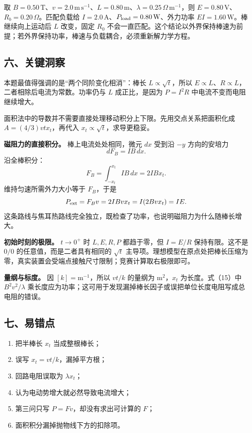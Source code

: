 \documentclass[12pt,a4paper,UTF8]{ctexart}
\newcommand{\tightlist}{\setlength{\itemsep}{0pt}\setlength{\parskip}{0pt}}
\begin{document}
取
\(B=0.50\,\mathrm T\)、\(v=2.0\,\mathrm{m\,s^{-1}}\)、\(L=0.80\,\mathrm m\)、\(\lambda=0.25\,\Omega\,\mathrm m^{-1}\)，则
\(E=0.80\,\mathrm V\)、\(R_b=0.20\,\Omega\)。匹配负载给
\(I=2.0\,\mathrm A\)、\(P_{\rm load}=0.80\,\mathrm W\)、外力功率
\(EI=1.60\,\mathrm W\)。棒继续向上运动后 \(L\) 改变，固定 \(R_0\)
不会一直匹配。这个结论以外界保持棒速为前提；若外界保持功率，棒速与负载耦合，必须重新解力学方程。

\subsection{六、关键洞察}\label{ux516dux5173ux952eux6d1eux5bdf-4}

本题最值得强调的是``两个同阶变化相消''：棒长 \(L\propto\sqrt t\)，所以
\(E\propto L\)、\(R\propto L\)，二者相除后电流为常数。功率仍与 \(L\)
成正比，是因为 \(P=I^2R\) 中电流不变而电阻继续增大。

面积法中的导数并不需要直接处理移动积分上下限。先用交点关系把面积化成
\(A=(4/3)vtx_t\)，再代入 \(x_t\propto\sqrt t\)，求导更稳妥。

\textbf{磁阻力的直接积分。} 棒上电流处处相同，微元 \(dx\) 受到沿 \(-y\)
方向的安培力 \[
dF_B=IB\,dx.
\] 沿全棒积分： \[
F_B=\int_{-x_t}^{x_t}IB\,dx
=2IBx_t.
\] 维持匀速所需外力大小等于 \(F_B\)，于是 \[
P_{\rm ext}=F_Bv
=2IBvx_t
=I(2Bvx_t)
=IE.
\]
这条路线与焦耳热路线完全独立，既检查了功率，也说明磁阻力为什么随棒长增大。

\textbf{初始时刻的极限。} \(t\to0^+\) 时 \(L,E,R,P\) 都趋于零，但
\(I=E/R\) 保持有限。这不是 \(0/0\) 的任意值，而是二者具有相同的
\(\sqrt t\)
主导项。理想模型在原点处把棒长压缩为零，真实装置会受端点接触尺寸限制；竞赛计算取右极限即可。

\textbf{量纲与标度。} 因 \([k]=\mathrm m^{-1}\)，所以 \(vt/k\) 的量纲为
\(\mathrm m^2\)，\(x_t\) 为长度。式（15）中 \(B^2v^2/\lambda\)
乘长度应为功率；这可用于发现漏掉棒长因子或误把单位长度电阻写成总电阻的错误。

\subsection{七、易错点}\label{ux4e03ux6613ux9519ux70b9-4}

\begin{enumerate}
\def\labelenumi{\arabic{enumi}.}
\tightlist
\item
  把半棒长 \(x_t\) 当成整根棒长；
\item
  误写 \(x_t=vt/k\)，漏掉平方根；
\item
  回路电阻误取为 \(\lambda x_t\)；
\item
  认为电动势增大就必然导致电流增大；
\item
  第三问只写 \(P=Fv\)，却没有求出可计算的 \(F\)；
\item
  面积积分漏掉抛物线下方的扣除项。
\end{enumerate}
\end{document}
